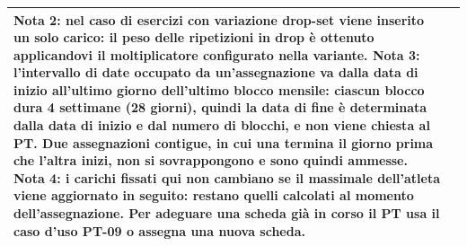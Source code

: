 \documentclass[../../../../SoftwareRequirementsSpecification.tex]{subfiles}
\begin{document}
\begin{tabularx}{\textwidth}{|l|X|}
{    \textbf{Nota 2:} nel caso di esercizi con variazione drop-set
    viene inserito un solo carico: il peso delle ripetizioni in drop
    è ottenuto applicandovi il moltiplicatore configurato nella
    variante.\newline
    \textbf{Nota 3:} l'intervallo di date occupato da
    un'assegnazione va dalla data di inizio all'ultimo giorno
    dell'ultimo blocco mensile: ciascun blocco dura 4 settimane
    (28 giorni), quindi la data di fine è determinata dalla data di
    inizio e dal numero di blocchi, e non viene chiesta al PT. Due
    assegnazioni contigue, in cui una termina il giorno prima che
    l'altra inizi, non si sovrappongono e sono quindi ammesse.\newline
    \textbf{Nota 4:} i carichi fissati qui non cambiano se il
    massimale dell'atleta viene aggiornato in seguito: restano quelli
    calcolati al momento dell'assegnazione. Per adeguare una scheda
    già in corso il PT usa il caso d'uso PT-09 o assegna una nuova
    scheda.
  } \\ \hline
\end{tabularx}
\end{document}
